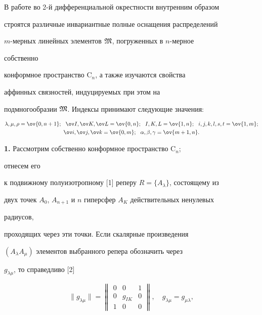 \label{begin} 


 


 


В работе во 2-й дифференциальной окрестности внутренним образом 


строятся различные инвариантные полные оснащения распределений 


$m$-мерных линейных элементов $\frak M$, погруженных в $n$-мерное 


собственно 


конформное пространство $\mathrm C_n$, а также изучаются свойства


аффинных связностей, индуцируемых при этом на 


подмногообразии $\frak M$. Индексы принимают следующие значения: 


\begin{gather*} 


\lambda,\mu,\rho=\ov{0,n+1};\ \ \ov I,\ov K,\ov L=\ov{0,n}; 


\ \ I,K,L=\ov{1,n};\ \ i,j,k,l,s,t=\ov{1,m};\\ 


\ov i,\ov j,\ov k=\ov{0,m}; 


\ \ \alpha,\beta,\gamma=\ov{m+1,n}. 


\end{gather*} 


 


{\bf 1.} Рассмотрим собственно конформное пространство $\mathrm C_n$; 


отнесем его 


к подвижному полуизотропному [1] реперу $R=\{A_\lambda\}$, состоящему из 


двух точек $A_0$, $A_{n+1}$ и $n$ гиперсфер $A_K$ действительных ненулевых 


радиусов, 


проходящих через эти точки. Если скалярные произведения 


$(A_\lambda A_\mu)$ элементов выбранного репера обозначить через 


$g_{\lambda\mu}$, то справедливо [2] 


\begin{equation} 


\|g_{\lambda\mu}\|= 


\begin{Vmatrix} 


0 & 0 & 1 \\ 0 & g_{I K} & 0 \\ 1 & 0 & 0 


\end{Vmatrix} 


,\quad g_{\lambda\mu}=g_{\mu\lambda}, 


\end{equation} 


